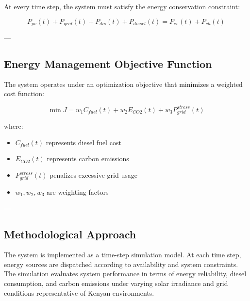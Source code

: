 At every time step, the system must satisfy the energy conservation constraint:

\begin{equation}
P_{pv}(t) + P_{grid}(t) + P_{dis}(t) + P_{diesel}(t)
=
P_{ev}(t) + P_{ch}(t)
\label{eq:energy_balance}
\end{equation}

---

\subsection{Energy Management Objective Function}

The system operates under an optimization objective that minimizes a weighted cost function:

\begin{equation}
\min J = w_1 C_{fuel}(t) + w_2 E_{CO2}(t) + w_3 P_{grid}^{stress}(t)
\label{eq:objective}
\end{equation}

where:
\begin{itemize}
    \item $C_{fuel}(t)$ represents diesel fuel cost
    \item $E_{CO2}(t)$ represents carbon emissions
    \item $P_{grid}^{stress}(t)$ penalizes excessive grid usage
    \item $w_1, w_2, w_3$ are weighting factors
\end{itemize}

---

\subsection{Methodological Approach}

The system is implemented as a time-step simulation model. At each time step, energy sources are dispatched according to availability and system constraints. The simulation evaluates system performance in terms of energy reliability, diesel consumption, and carbon emissions under varying solar irradiance and grid conditions representative of Kenyan environments.